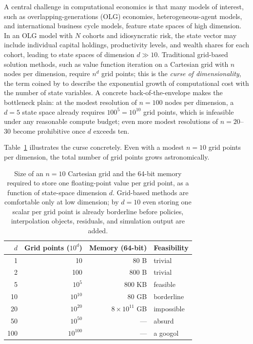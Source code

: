 \documentclass[11pt,a4paper]{report}
\begin{document}
A central challenge in computational economics is that many models of interest, such as overlapping-generations (OLG) economies, heterogeneous-agent models, and international business cycle models, feature state spaces of high dimension.  In an OLG model with $N$ cohorts and idiosyncratic risk, the state vector may include individual capital holdings, productivity levels, and wealth shares for each cohort, leading to state spaces of dimension $d \gg 10$.  Traditional grid-based solution methods, such as value function iteration on a Cartesian grid with $n$ nodes per dimension, require $n^d$ grid points; this is the \emph{curse of dimensionality}, the term coined by \citet{bellman1961adaptive} to describe the exponential growth of computational cost with the number of state variables.  A concrete back-of-the-envelope makes the bottleneck plain: at the modest resolution of $n=100$ nodes per dimension, a $d=5$ state space already requires $100^5 = 10^{10}$ grid points, which is infeasible under any reasonable compute budget; even more modest resolutions of $n=20$--$30$ become prohibitive once $d$ exceeds ten.

Table~\ref{tab:curse_of_dim} illustrates the curse concretely.  Even with a modest $n=10$ grid points per dimension, the total number of grid points grows astronomically.

\begin{table}[ht]
\centering
\small
\begin{tabular}{r r r l}
\toprule
$d$ & Grid points ($10^d$) & Memory (64-bit) & Feasibility \\
\midrule
1 & 10 & 80 B & trivial \\
2 & 100 & 800 B & trivial \\
5 & $10^5$ & 800 KB & feasible \\
10 & $10^{10}$ & 80 GB & borderline \\
20 & $10^{20}$ & $8 \times 10^{11}$ GB & impossible \\
50 & $10^{50}$ & --- & absurd \\
100 & $10^{100}$ & --- & a googol \\
\bottomrule
\end{tabular}
\caption{Size of an $n = 10$ Cartesian grid and the 64-bit memory required to store one floating-point value per grid point, as a function of state-space dimension $d$.  Grid-based methods are comfortable only at low dimension; by $d = 10$ even storing one scalar per grid point is already borderline before policies, interpolation objects, residuals, and simulation output are added.}
\label{tab:curse_of_dim}
\end{table}
\end{document}
